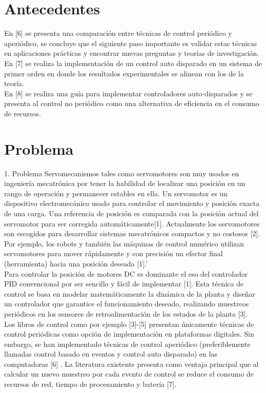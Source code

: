 \section{Antecedentes}

En [6] se presenta una comparación entre técnicas de control periódico y aperiódico, se concluye que el siguiente paso importante es validar estas técnicas en aplicaciones prácticas y encontrar nuevas preguntas y teorías de investigación.\\ 

En [7] se realiza la implementación de un control auto disparado en un sistema de primer orden en donde los resultados experimentales se alinean con los de la teoría.\\

En [8] se realiza  una guía para implementar  controladores auto-disparados y se presenta al control no periódico como una alternativa de eficiencia en el consumo de recursos.\\


\section{Problema}

1.	Problema 
Servomecanismos tales como servomotores son muy usados en ingeniería mecatrónica por tener la habilidad de localizar una posición en un rango de operación y permanecer estables en ella. Un servomotor es un dispositivo electromecánico usado para controlar el movimiento y posición exacta de una carga. Una referencia de posición es comparada con la posición actual del servomotor para ser corregida automáticamente[1]. Actualmente los servomotores son escogidos para desarrollar sistemas mecatrónicos compactos y no costosos [2].  Por ejemplo, los robots y también las máquinas de control numérico utilizan servomotores para mover rápidamente y con precisión un efector final (herramienta) hacia una posición deseada [1].'\\

Para controlar la posición de motores DC es dominante el eso del controlador PID convencional por ser sencillo y fácil de implementar [1]. Esta técnica de control se basa en modelar matemáticamente la dinámica de la planta y diseñar un controlador que garantice el funcionamiento deseado, realizando muestreos periódicos en los sensores de retroalimentación de los estados de la planta [3].\\

Los libros de control como por ejemplo [3]-[5] presentan únicamente técnicas de control periódicas como opción de implementación en plataformas digitales. Sin embargo, se han implementado técnicas de control aperiódico (preferiblemente llamadas control basado en eventos y control auto disparado) en las computadoras [6] . La literatura existente presenta como ventaja principal que al calcular un nuevo muestreo por cada evento de control se reduce el consumo de recursos de red, tiempo de procesamiento y batería [7].\\

